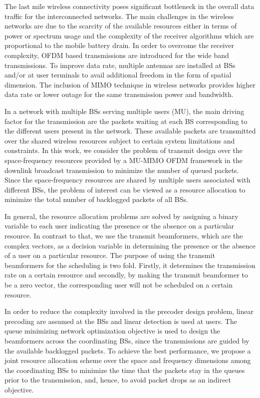 
The last mile wireless connectivity poses significant bottleneck in the overall data traffic for the interconnected networks. The main challenges in the wireless networks are due to the scarcity of the available resources either in terms of power or spectrum usage and the complexity of the receiver algorithms which are proportional to the mobile battery drain. In order to overcome the receiver complexity, \ac{OFDM} based transmissions are introduced for the wide band transmissions. To improve data rate, multiple antennas are installed at \acp{BS} and/or at user terminals to avail additional freedom in the form of spatial dimension. The inclusion of \ac{MIMO} technique in wireless networks provides higher data rate or lower outage for the same transmission power and bandwidth.

In a network with multiple \acp{BS} serving multiple users (\acs{MU}), the main driving factor for the transmission are the packets waiting at each \ac{BS} corresponding to the different users present in the network. These available packets are transmitted over the shared wireless resources subject to certain system limitations and constraints. In this work, we consider the problem of transmit design over the space-frequency resources provided by a \ac{MU-MIMO} \ac{OFDM} framework in the downlink broadcast transmission to minimize the number of queued packets. Since the space-frequency resources are shared by multiple users associated with different \acp{BS}, the problem of interest can be viewed as a resource allocation to minimize the total number of backlogged packets of all \acp{BS}.

In general, the resource allocation problems are solved by assigning a binary variable to each user indicating the presence or the absence on a particular resource. In contrast to that, we use the transmit beamformers, which are the complex vectors, as a decision variable in determining the presence or the absence of a user on a particular resource. The purpose of using the transmit beamformers for the scheduling is two fold. Firstly, it determines the transmission rate on a certain resource and secondly, by making the transmit beamformer to be a zero vector, the corresponding user will not be scheduled on a certain resource.

In order to reduce the complexity involved in the precoder design problem, linear precoding are assumed at the \acp{BS} and linear detection is used at users. The queue minimizing network optimization objective is used to design the beamformers across the coordinating \acp{BS}, since the transmissions are guided by the available backlogged packets. To achieve the best performance, we propose a joint resource allocation scheme over the space and frequency dimensions among the coordinating \acp{BS} to minimize the time that the packets stay in the queues prior to the transmission, and, hence, to avoid packet drops as an indirect objective.

